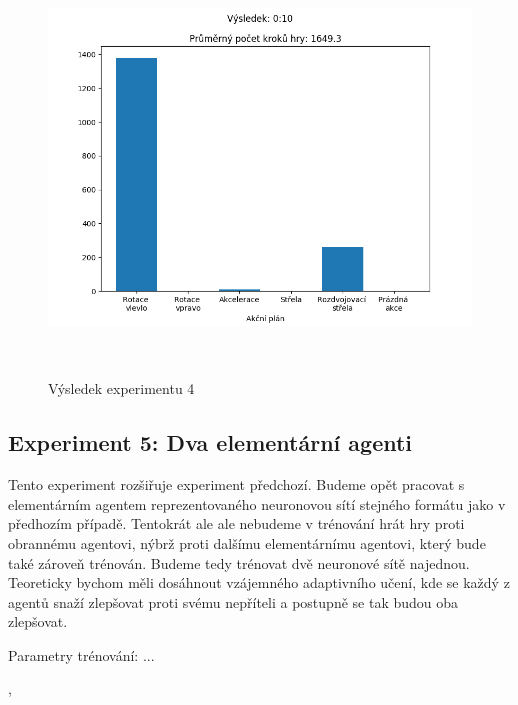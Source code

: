 \begin{figure}[p]\centering
\includegraphics[width=145mm, height=110mm]{./Obrazky/Experiment04Results.png}
\caption{Výsledek experimentu 4}
\label{obr06:Výsledek experimentu 04}
\end{figure}
    



\subsection{Experiment 5: Dva elementární agenti}
Tento experiment rozšiřuje experiment předchozí. Budeme opět pracovat s elementárním agentem reprezentovaného neuronovou sítí stejného formátu jako v předhozím případě.
Tentokrát ale ale nebudeme v trénování hrát hry proti obrannému agentovi, nýbrž proti dalšímu elementárnímu agentovi, který bude také zároveň trénován.
Budeme tedy trénovat dvě neuronové sítě najednou. Teoreticky bychom měli dosáhnout vzájemného adaptivního učení, kde se každý z agentů snaží zlepšovat proti svému nepříteli a postupně se tak budou oba zlepšovat.
\par
Parametry trénování: ... 




,